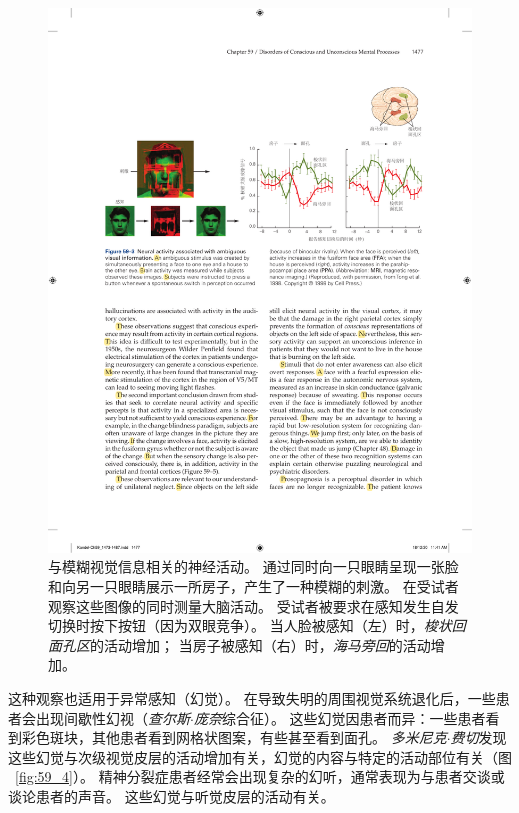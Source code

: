 \begin{figure}[htbp]
	\centering
	\includegraphics[width=1.0\linewidth]{chap59/fig_59_3}
	\caption{与模糊视觉信息相关的神经活动。
		通过同时向一只眼睛呈现一张脸和向另一只眼睛展示一所房子，产生了一种模糊的刺激。
		在受试者观察这些图像的同时测量大脑活动。
		受试者被要求在感知发生自发切换时按下按钮（因为双眼竞争）。
		当人脸被感知（左）时，\textit{梭状回面孔区}的活动增加；
		当房子被感知（右）时，\textit{海马旁回}的活动增加\cite{tong1998binocular}。}
	\label{fig:59_3}
\end{figure}


这种观察也适用于异常感知（幻觉）。
在导致失明的周围视觉系统退化后，一些患者会出现间歇性幻视（\textit{查尔斯$\cdot$庞奈}综合征）。
这些幻觉因患者而异：一些患者看到彩色斑块，其他患者看到网格状图案，有些甚至看到面孔。
\textit{多米尼克$\cdot$费切}发现这些幻觉与次级视觉皮层的活动增加有关，幻觉的内容与特定的活动部位有关（图 ~\ref{fig:59_4}）。
精神分裂症患者经常会出现复杂的幻听，通常表现为与患者交谈或谈论患者的声音。
这些幻觉与听觉皮层的活动有关。


